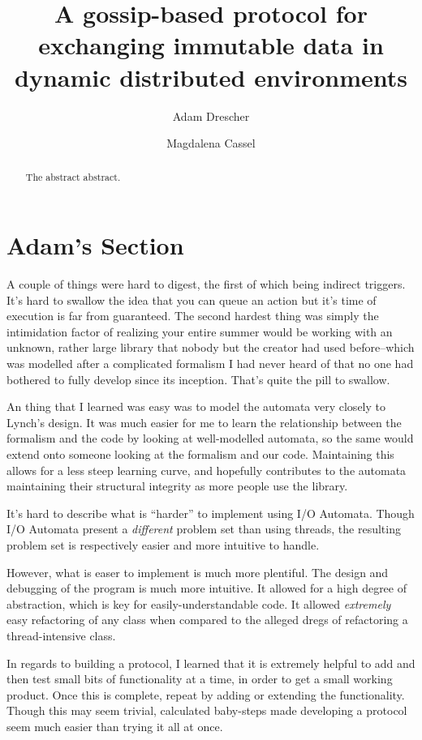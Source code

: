 \documentclass[letterpaper]{article}
\begin{document}
\title{A gossip-based protocol for exchanging immutable data in dynamic distributed environments}
\author{Adam Drescher \and Magdalena Cassel}
\date{}

\maketitle

\begin{abstract}
The abstract abstract.
\end{abstract}

\section{Adam's Section}
A couple of things were hard to digest, the first of which being indirect triggers.  
It's hard to swallow the idea that you can queue an action but it's time of execution is far from guaranteed.  
The second hardest thing was simply the intimidation factor of realizing your entire summer would be working with an unknown, rather large library that nobody but the creator had used before--which was modelled after a complicated formalism I had never heard of that no one had bothered to fully develop since its inception.  
That's quite the pill to swallow.

An thing that I learned was easy was to model the automata very closely to Lynch's design.  
It was much easier for me to learn the relationship between the formalism and the code by looking at well-modelled automata, so the same would extend onto someone looking at the formalism and our code. 
Maintaining this allows for a less steep learning curve, and hopefully contributes to the automata maintaining their structural integrity as more people use the library.

It's hard to describe what is ``harder'' to implement using I/O Automata.  
Though I/O Automata present a \emph{different} problem set than using threads, the resulting problem set is respectively easier and more intuitive to handle.  

However, what is easer to implement is much more plentiful.
The design and debugging of the program is much more intuitive.
It allowed for a high degree of abstraction, which is key for easily-understandable code.
It allowed \emph{extremely} easy refactoring of any class when compared to the alleged dregs of refactoring a thread-intensive class.

In regards to building a protocol, I learned that it is extremely helpful to add and then test small bits of functionality at a time, in order to get a small working product.
Once this is complete, repeat by adding or extending the functionality.
Though this may seem trivial, calculated baby-steps made developing a protocol seem much easier than trying it all at once.
\end{document}
